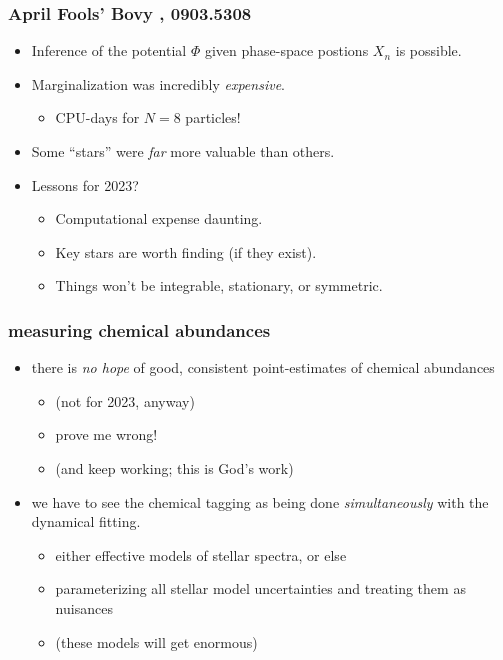 \documentclass[pdftex]{beamer}
\begin{document}
\begin{frame}
  \frametitle{April Fools' {\footnotesize Bovy \etal, 0903.5308}}
  \begin{itemize}
  \item Inference of the potential $\Phi$ given phase-space postions
    $X_n$ is possible.
  \item Marginalization was incredibly \emph{expensive}.
    \begin{itemize}
    \item CPU-days for $N=8$ particles!
    \end{itemize}
  \item Some ``stars'' were \emph{far} more valuable than others.
  \item Lessons for 2023?
    \begin{itemize}
    \item Computational expense daunting.
    \item Key stars are worth finding (if they exist).
    \item Things won't be integrable, stationary, or symmetric.
    \end{itemize}
  \end{itemize}
\end{frame}

\begin{frame}
  \frametitle{measuring chemical abundances}
  \begin{itemize}
  \item there is \emph{no hope} of good, consistent point-estimates of
    chemical abundances
    \begin{itemize}
    \item (not for 2023, anyway)
    \item prove me wrong!
    \item (and keep working; this is God's work)
    \end{itemize}
  \item we have to see the chemical tagging as being done
    \emph{simultaneously} with the dynamical fitting.
    \begin{itemize}
    \item either effective models of stellar spectra, or else
    \item parameterizing all stellar model uncertainties and treating them as nuisances
    \item (these models will get enormous)
    \end{itemize}
  \end{itemize}
\end{frame}
\end{document}
